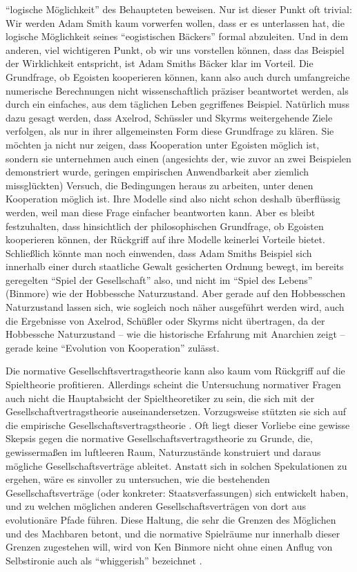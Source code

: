 \documentclass[12pt,a4paper,ngerman]{article}
\begin{document}
"`logische Möglichkeit"' des Behaupteten beweisen. Nur ist dieser
Punkt oft trivial: Wir werden Adam Smith kaum vorwerfen wollen, dass
er es unterlassen hat, die logische Möglichkeit seines "`eogistischen
Bäckers"' formal abzuleiten. Und in dem anderen, viel wichtigeren
Punkt, ob wir uns vorstellen können, dass das Beispiel der
Wirklichkeit entspricht, ist Adam Smiths Bäcker klar im Vorteil. Die
Grundfrage, ob Egoisten kooperieren können, kann also auch durch
umfangreiche numerische Berechnungen nicht wissenschaftlich präziser
beantwortet werden, als durch ein einfaches, aus dem täglichen Leben
gegriffenes Beispiel. Natürlich muss dazu gesagt werden, dass Axelrod,
Schüssler und Skyrms weitergehende Ziele verfolgen, als nur in ihrer
allgemeinsten Form diese Grundfrage zu klären. Sie möchten ja nicht
nur zeigen, dass Kooperation unter Egoisten möglich ist, sondern sie
unternehmen auch einen (angesichts der, wie zuvor an zwei Beispielen
demonstriert wurde, geringen empirischen Anwendbarkeit aber ziemlich
missglückten) Versuch, die Bedingungen heraus zu arbeiten, unter denen
Kooperation möglich ist.  Ihre Modelle sind also nicht schon deshalb
überflüssig werden, weil man diese Frage einfacher beantworten kann.
Aber es bleibt festzuhalten, dass hinsichtlich der philosophischen
Grundfrage, ob Egoisten kooperieren können, der Rückgriff auf ihre
Modelle keinerlei Vorteile bietet. Schließlich könnte man noch
einwenden, dass Adam Smiths Beispiel sich innerhalb einer durch
staatliche Gewalt gesicherten Ordnung bewegt, im bereits geregelten
"`Spiel der Gesellschaft"' also, und nicht im "`Spiel des Lebens"'
(Binmore) wie der Hobbessche Naturzustand. Aber gerade auf den
Hobbesschen Naturzustand lassen sich, wie sogleich noch näher
ausgeführt werden wird, auch die Ergebnisse von Axelrod, Schüßler oder
Skyrms nicht übertragen, da der Hobbessche Naturzustand -- wie die
historische Erfahrung mit Anarchien zeigt -- gerade keine "`Evolution
von Kooperation"' zulässt.

Die normative Gesellschftsvertragstheorie kann also kaum vom Rückgriff
auf die Spieltheorie profitieren. Allerdings scheint die Untersuchung
normativer Fragen auch nicht die Hauptabsicht der Spieltheoretiker zu
sein, die sich mit der Gesellschaftvertragstheorie auseinandersetzen.
Vorzugsweise stützten sie sich auf die empirische Gesellschaftsvertragstheorie
\cite{skyrms:1999, binmore:1994}. Oft liegt dieser Vorliebe eine
gewisse Skepsis gegen die normative Gesellschaftsvertragstheorie zu
Grunde, die, gewissermaßen im luftleeren Raum, Naturzustände
konstruiert und daraus mögliche Gesellschaftsverträge
ableitet. Anstatt sich in solchen Spekulationen zu ergehen, wäre es
sinvoller zu untersuchen, wie die bestehenden Gesellschaftsverträge
(oder konkreter: Staatsverfassungen) sich entwickelt haben, und zu
welchen möglichen anderen Gesellschaftsverträgen von dort aus
evolutionäre Pfade führen. Diese Haltung, die sehr die Grenzen des
Möglichen und des Machbaren betont, und die normative Spielräume nur
innerhalb dieser Grenzen zugestehen will, wird von Ken Binmore nicht
ohne einen Anflug von Selbstironie auch als "`whiggerish"' bezeichnet
\cite[S. 1-7]{binmore:1994}.
\end{document}
